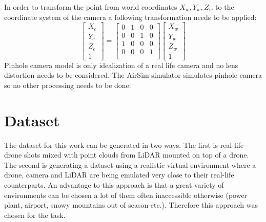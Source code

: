 \documentclass[twoside]{ctuthesis}
\theoremstyle{plain}
\theoremstyle{definition}
\theoremstyle{note}
\begin{document}
In order to transform the point from world coordinates $X_w,Y_w,Z_w$ to the coordinate system of the camera a following transformation needs to be applied:
\begin{equation}
	\begin{bmatrix}
		X_c\\
		Y_c\\
		Z_c\\
		1
	\end{bmatrix}=
	\begin{bmatrix}
		0 & 1 & 0 & 0\\
		0 & 0 & 1 & 0\\
		1 & 0 & 0 & 0\\
		0 & 0 & 0 & 1\\
	\end{bmatrix}
	\begin{bmatrix}
		X_w\\
		Y_w\\
		Z_w\\
		1
	\end{bmatrix}
\end{equation}
Pinhole camera model is only idealization of a real life camera and no lens distortion needs to be considered. The AirSim simulator simulates pinhole camera so no other processing needs to be done.
\section{Dataset}
The dataset for this work can be generated in two ways. The first is real-life drone shots mixed with point clouds from LiDAR mounted on top of a drone. The second is generating a dataset using a realistic virtual environment where a drone, camera and LiDAR are being emulated very close to their real-life counterparts. An advantage to this approach is that a great variety of environments can be chosen a lot of them often inaccessible otherwise (power plant, airport, snowy mountains out of season etc.). Therefore this approach was chosen for the task.
\end{document}
